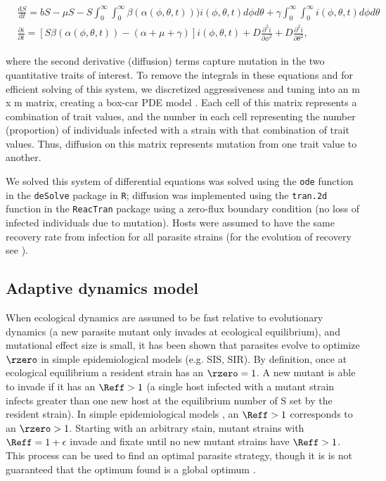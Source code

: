 \begin{align*}
& \frac{\mathrm{d} S}{\mathrm{d} t} = bS - \mu S - S \int_{0}^{\infty}  \int_{0}^{\infty} \beta(\alpha(\phi, \theta, t)))i(\phi, \theta, t)d\phi d\theta + \gamma \int_{0}^{\infty}  \int_{0}^{\infty} i(\phi, \theta, t)d\phi d\theta \\ 
& \frac{\partial i}{\partial t} = [S\beta(\alpha(\phi, \theta, t)) - (\alpha + \mu + \gamma)]i(\phi, \theta, t) + D\frac{\partial^2 i}{\partial \phi^2} + D\frac{\partial^2 i}{\partial \theta^2},
\end{align*}

\noindent where the second derivative (diffusion) terms capture mutation in the two quantitative traits of interest. To remove the integrals in these equations and for efficient solving of this system, we discretized aggressiveness and tuning into an m x m matrix, creating a box-car PDE model \citep{DeRoos1988}. Each cell of this matrix represents a combination of trait values, and the number in each cell representing the number (proportion) of individuals infected with a strain with that combination of trait values. Thus, diffusion on this matrix represents mutation from one trait value to another. 

We solved this system of differential equations was solved using the {\tt ode} function in the {\tt deSolve} package in {\tt R}; diffusion was implemented using the {\tt tran.2d} function in the {\tt ReacTran} package using a zero-flux boundary condition (no loss of infected individuals due to mutation). Hosts were assumed to have the same recovery rate from infection for all parasite strains (for the evolution of recovery see \citealt{AndersonandMay1982, AlizonandvanBaalen2005}). 

\subsection*{Adaptive dynamics model}

When ecological dynamics are assumed to be fast relative to evolutionary dynamics (a new parasite mutant only invades at ecological equilibrium), and mutational effect size is small, it has been shown that parasites evolve to optimize $\rzero$ \cite{Dieckmann2002, KeelingandRohani2008, Lion2018} in simple epidemiological models (e.g. SIS, SIR). By definition, once at ecological equilibrium a resident strain has an $\rzero = 1$. A new mutant is able to invade if it has an $\Reff > 1$ (a single host infected with a mutant strain infects greater than one new host at the equilibrium number of S set by the resident strain). In simple epidemiological models \cite{Dieckmann2002, KeelingandRohani2008, Lion2018}, an $\Reff > 1$ corresponds to an $\rzero > 1$. Starting with an arbitrary stain, mutant strains with $\Reff = 1 + \epsilon$ invade and fixate until no new mutant strains have $\Reff > 1$. This process can be used to find an optimal parasite strategy, though it is is not guaranteed that the optimum found is a global optimum \citep{Dieckmann2002}.

